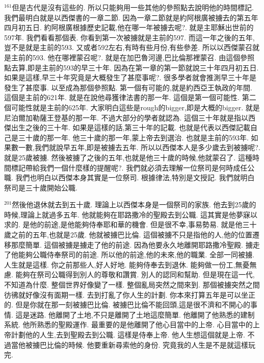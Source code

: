 \documentclass{book}
\begin{document}
$^{161}$但是古代是沒有這些的.
所以只能夠用一些其他的參照點去說明他的時間標記.
我們最明白就是以西傑書的一章二節.
因為一章二節就是約阿根廣被擄去的第五年四月初五日.
約阿根廣根據歷史記載,他在哪一年被擄去呢?.
就是主耶穌出世前的597年.
我們看看那個表.
你看到第一次被擄就是主前的597.
而這一年之後的五年,豈不是就是主前的593.
又或者592左右,有時有些月份,有些參差.
所以以西傑蒙召就是主前的593.
他在哪裡蒙召呢?.
就是在加巴魯河邊,巴比倫那裡蒙召.
由這個參照點去算,即是主前的593的早三十年.
因為在第一章的第一節就說三十年四月初五日.
如果是這樣,早三十年究竟是大概發生了甚麼事呢?.
很多學者就會推測早三十年是發生了甚麼事.
以至成為那個參照點.
第一個有可能的,就是約西亞王執政的年間.
這個是主前的621年.
就是在說他尋獲律法書的那一年.
這個是第一個可能性.
第二個可能性就是主前的625年.
大家明白這些是rough的bigger,即是大概的bigger.
就是尼泊爾加勒薩王登基的那一年.
不過大部分的學者就認為.
這個三十年就是指以西傑出生之後的三十年.
如果是這樣的話,第三十年的記載.
也就是代表以西傑記載自己是三十歲的那一年.
他三十歲的那一年,蒙上帝去到選治.
也就是主前的593年.
如果數一數,我們就說早五年,即是被擄去五年.
所以以西傑本人是多少歲去到被擄呢?.
就是25歲被擄.
然後被擄了之後的五年,也就是他三十歲的時候,他就蒙召了.
這種時間標記帶給我們一個什麼樣的提醒呢?.
我們就必須去理解一位祭司是何時成任公職.
我們也明白以西傑本身其實是一位祭司.
根據律法,特別是文授記.
我們就明白祭司是三十歲開始公職.

$^{201}$然後他退休就去到五十歲.
理論上以西傑本身是一個祭司的家族.
他去到25歲的時候,理論上就過多五年.
他就能夠在耶路撒冷的聖殿去到公職.
這其實是他夢寐以求的.
是他的前途,是他能夠侍奉耶和華的機會.
但是很不幸,事易勢易.
就是他三十歲之前的五年,也就是25歲.
他就被擄巴比倫.
這個被擄不只是指他的人,他的位置遷移那麼簡單.
這個被擄是擄走了他的前途.
因為他要永久地離開耶路撒冷聖殿.
擄走了他能夠公職侍奉祭司的前途.
所以他的前途,他的未來,他的職業.
全部一同被擄.
人生就是這樣.
你之前那些人,好人好地.
能夠侍奉去到退休.
能夠做一份工,無憂無慮.
能夠在祭司公職得到別人的尊敬和讚賞.
別人的認同和幫助.
但是現在這一代,不知道為什麼.
整個世界好像變了一樣.
整個亂局突然之間來到.
那個被擄突然之間彷彿就好像沒有面期一樣.
去到打亂了你人生的計劃.
你本來打算五年是可以坐正的.
但是你就在那一刻被擄巴比倫.
被擄巴比倫不能回頭,這是很不濟和不開心的事情.
這是迷路.
他離開了土地,不只是離開了土地這麼簡單.
他離開了他熟悉的建制系統.
他所熟悉的聖殿運作.
最重要的是他離開了他心目當中的上帝.
心目當中的上帝計劃他的人生,去到聖殿去到公職.
這樣是侍奉上帝.
他人生想這個就是上帝.
不過當他被擄巴比倫的時候.
他要重新尋索他的身份.
究竟我的人生是不是就這樣玩完.
\end{document}
